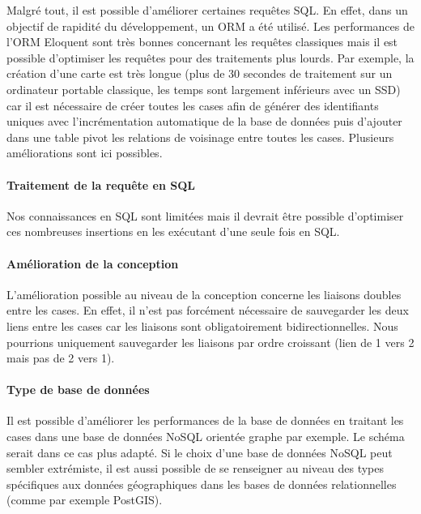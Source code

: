 		Malgré tout, il est possible d'améliorer certaines requêtes SQL. En effet, dans un objectif de rapidité du développement, un ORM a été utilisé. Les performances de l'ORM Eloquent sont très bonnes concernant les requêtes classiques mais il est possible d'optimiser les requêtes pour des traitements plus lourds. Par exemple, la création d'une carte est très longue (plus de 30 secondes de traitement sur un ordinateur portable classique, les temps sont largement inférieurs avec un SSD) car il est nécessaire de créer toutes les cases afin de générer des identifiants uniques avec l'incrémentation automatique de la base de données puis d'ajouter dans une table pivot les relations de voisinage entre toutes les cases. Plusieurs améliorations sont ici possibles.

		\paragraph{Traitement de la requête en SQL} %
		\label{par:traitement_de_la_requete_en_sql}

			Nos connaissances en SQL sont limitées mais il devrait être possible d'optimiser ces nombreuses insertions en les exécutant d'une seule fois en SQL.


		\paragraph{Amélioration de la conception} %
		\label{par:amelioration_de_la_conception}

			L'amélioration possible au niveau de la conception concerne les liaisons doubles entre les cases. En effet, il n'est pas forcément nécessaire de sauvegarder les deux liens entre les cases car les liaisons sont obligatoirement bidirectionnelles. Nous pourrions uniquement sauvegarder les liaisons par ordre croissant (lien de 1 vers 2 mais pas de 2 vers 1).


		\paragraph{Type de base de données} %
		\label{par:type_de_base_de_donnees}

			Il est possible d'améliorer les performances de la base de données en traitant les cases dans une base de données NoSQL orientée graphe par exemple. Le schéma serait dans ce cas plus adapté. Si le choix d'une base de données NoSQL peut sembler extrémiste, il est aussi possible de se renseigner au niveau des types spécifiques aux données géographiques dans les bases de données relationnelles (comme par exemple PostGIS).

